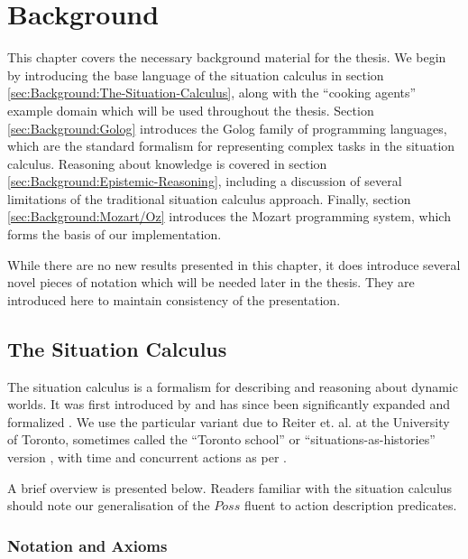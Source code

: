 


\chapter{Background}

\label{ch:background}

This chapter covers the necessary background material for the thesis.
We begin by introducing the base language of the situation calculus
in section \ref{sec:Background:The-Situation-Calculus}, along with
the {}``cooking agents'' example domain which will be used throughout
the thesis. Section \ref{sec:Background:Golog} introduces the Golog
family of programming languages, which are the standard formalism
for representing complex tasks in the situation calculus. Reasoning
about knowledge is covered in section \ref{sec:Background:Epistemic-Reasoning},
including a discussion of several limitations of the traditional situation
calculus approach. Finally, section \ref{sec:Background:Mozart/Oz}
introduces the Mozart programming system, which forms the basis of
our implementation.

While there are no new results presented in this chapter, it does
introduce several novel pieces of notation which will be needed later
in the thesis. They are introduced here to maintain consistency of
the presentation.


\section{The Situation Calculus\label{sec:Background:The-Situation-Calculus}}

The situation calculus is a formalism for describing and reasoning
about dynamic worlds. It was first introduced by \citet{McCHay69sitcalc}
and has since been significantly expanded and formalized \citep{reiter91frameprob,pirri99contributions_sitcalc}.
We use the particular variant due to Reiter et. al. at the University
of Toronto, sometimes called the {}``Toronto school'' or {}``situations-as-histories''
version \citep{levesque98sc_foundations}, with time and concurrent
actions as per \citep{reiter96sc_nat_conc}.

A brief overview is presented below. Readers familiar with the situation
calculus should note our generalisation of the $Poss$ fluent to action
description predicates.


\subsection{Notation and Axioms\label{sub:Notation-and-Axioms}}

